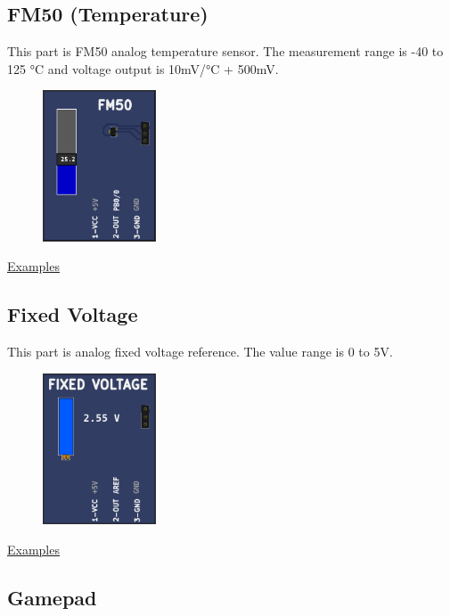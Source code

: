 \subsection{FM50 (Temperature)}

This part is FM50 analog temperature sensor. The measurement range is -40 to 125 °C  and 
voltage output is 10mV/°C + 500mV.

\begin{figure}[H]
\center
\includegraphics[width=0.3\textwidth]{img/part_fm50.png} 
\end{figure} 


\href{https://lcgamboa.github.io/picsimlab_examples/Parts.html\#FM50_(Temperature)}{Examples}

\subsection{Fixed Voltage}

This part is analog fixed voltage reference. The value range is 0 to 5V.

\begin{figure}[H]
\center
\includegraphics[width=0.3\textwidth]{img/part_fixedv.png} 
\end{figure} 


\href{https://lcgamboa.github.io/picsimlab_examples/Parts.html\#Fixed_Voltage}{Examples}

 
\subsection{Gamepad}

